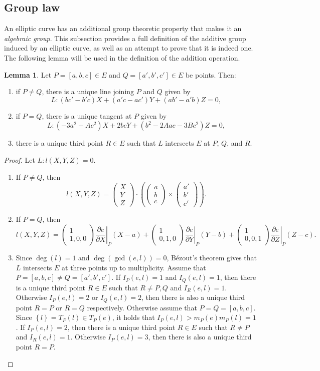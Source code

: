 \documentclass{article}
\newcommand{\val}[1]{\left. #1 \right\rvert}
\newcommand{\rb}[1]{\left( #1 \right)}
\renewcommand{\sb}[1]{\left[ #1 \right]}
\newcommand{\cb}[1]{\left\{ #1 \right\}}
\newcommand{\twobyone}[2]{\begin{pmatrix} #1 \\ #2 \end{pmatrix}}
\newcommand{\threebyone}[3]{\begin{pmatrix} #1 \\ #2 \\ #3 \end{pmatrix}}
\theoremstyle{definition}
\newtheorem{lemma}[proposition]{Lemma}
\begin{document}
\pagebreak

\subsection{Group law}

An elliptic curve has an additional group theoretic property that makes it an \emph{algebraic group}. This subsection provides a full definition of the additive group induced by an elliptic curve, as well as an attempt to prove that it is indeed one. The following lemma will be used in the definition of the addition operation.

\begin{lemma}
\label{lem:thirdpoint}
Let $ P = \sb{a, b, c} \in E $ and $ Q = \sb{a', b', c'} \in E $ be points. Then:
\begin{enumerate}
\item if $ P \ne Q $, there is a unique line joining $ P $ and $ Q $ given by
$$ L : \rb{bc' - b'c}X + \rb{a'c - ac'}Y + \rb{ab' - a'b}Z = 0, $$
\item if $ P = Q $, there is a unique tangent at $ P $ given by
$$ L : \rb{-3a^2 - Ac^2}X + 2bcY + \rb{b^2 - 2Aac - 3Bc^2}Z = 0, $$
\item there is a unique third point $ R \in E $ such that $ L $ intersects $ E $ at $ P $, $ Q $, and $ R $.
\end{enumerate}
\end{lemma}

\begin{proof}
Let $ L : l\rb{X, Y, Z} = 0 $.
\begin{enumerate}
\item If $ P \ne Q $, then
$$ l\rb{X, Y, Z} = \threebyone{X}{Y}{Z} \cdot \rb{\threebyone{a}{b}{c} \times \threebyone{a'}{b'}{c'}}. $$
\item If $ P = Q $, then
$$ l\rb{X, Y, Z} = \twobyone{1}{1, 0, 0}\val{\dfrac{\partial e}{\partial X}}_P\rb{X - a} + \twobyone{1}{0, 1, 0}\val{\dfrac{\partial e}{\partial Y}}_P\rb{Y - b} + \twobyone{1}{0, 0, 1}\val{\dfrac{\partial e}{\partial Z}}_P\rb{Z - c}. $$
\item Since $ \deg\rb{l} = 1 $ and $ \deg\rb{\gcd\rb{e, l}} = 0 $, B\'ezout's theorem gives that $ L $ intersects $ E $ at three points up to multiplicity. Assume that $ P = \sb{a, b, c} \ne Q = \sb{a', b', c'} $. If $ I_P\rb{e, l} = 1 $ and $ I_Q\rb{e, l} = 1 $, then there is a unique third point $ R \in E $ such that $ R \ne P, Q $ and $ I_R\rb{e, l} = 1 $. Otherwise $ I_P\rb{e, l} = 2 $ or $ I_Q\rb{e, l} = 2 $, then there is also a unique third point $ R = P $ or $ R = Q $ respectively. Otherwise assume that $ P = Q = \sb{a, b, c} $. Since $ \cb{l} = T_P\rb{l} \in T_P\rb{e} $, it holds that $ I_P\rb{e, l} > m_P\rb{e}m_P\rb{l} = 1 $. If $ I_P\rb{e, l} = 2 $, then there is a unique third point $ R \in E $ such that $ R \ne P $ and $ I_R\rb{e, l} = 1 $. Otherwise $ I_P\rb{e, l} = 3 $, then there is also a unique third point $ R = P $.
\end{enumerate}
\end{proof}
\end{document}
